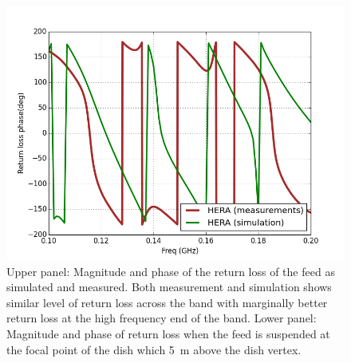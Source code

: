 \documentclass[twocolumn]{emulateapj}
\begin{document}
\begin{figure}[ht]
\begin{minipage}[b]{0.5\linewidth}
\end{minipage}
\hspace{0.1cm}
\begin{minipage}[b]{0.5\linewidth}
\centering
\includegraphics[angle=0, width=\linewidth]{GB_reflectometry_part3/plot/RL_ph_HERA.png}
\end{minipage}
\caption{Upper panel: Magnitude and phase of the return loss of the feed as simulated and measured. Both measurement and simulation shows similar level of return loss across the band with marginally better return loss at the high frequency end of the band. Lower panel: Magnitude and phase of return loss when the feed is suspended at the focal point of the dish which 5~m above the dish vertex.}   
\label{RL_mag_dish}
\end{figure}
\end{document}
